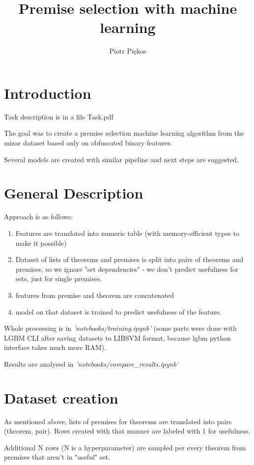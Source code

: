 \documentclass{article} %
\author{Piotr Piękos}
\title{%
Premise selection with machine learning}
\begin{document}
\maketitle

\section{Introduction}

Task description is in a file Task.pdf

 The goal was to create a premise selection machine learning algorithm from the mizar dataset based only on obfuscated binary features. 
 
 Several models are created with similar pipeline and next steps are suggested.
\section{General Description}
	
Approach is as follows:
\begin{enumerate}
\item Features are translated into numeric table (with memory-efficient types to make it possible)
\item Dataset of lists of theorems and premises is split into pairs of theorems and premises, so we ignore "set dependencies" - we don't predict usefulness for sets, just for single premises.
\item features from premise and theorem are concatenated
\item model on that dataset is trained to predict usefulness of the feature.
\end{enumerate}

Whole processing is in \textit{'notebooks/training.ipynb'} 
(some parts were done with LGBM CLI after saving datasets to LIBSVM format, because lgbm python interface takes much more RAM).

Results are analysed in \textit{'notebooks/compare\_results.ipynb'}

\section{Dataset creation}

As mentioned above, lists of premises for theorems are translated into pairs (theorem, pair). Rows created with that manner are labeled with 1 for usefulness. 

Additional N rows (N is a hyperparameter) are sampled per every theorem from premises that aren't in "useful" set.
\end{document}
